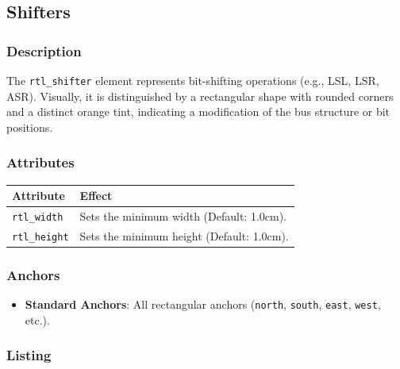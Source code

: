 \subsection{\sffamily Shifters}

    \subsubsection{\sffamily Description}
        The \texttt{rtl\_shifter} element represents bit-shifting operations (e.g., LSL, LSR, ASR). Visually, it is distinguished by a rectangular shape with rounded corners and a distinct orange tint, indicating a modification of the bus structure or bit positions.

    \subsubsection{\sffamily Attributes}
    \begin{center}
        \begin{tabular}{lp{8cm}}
        \toprule
            \textbf{Attribute} & \textbf{Effect} \\
            \midrule
            \texttt{rtl\_width} & Sets the minimum width (Default: 1.0cm). \\
            \texttt{rtl\_height} & Sets the minimum height (Default: 1.0cm). \\
            \bottomrule
        \end{tabular}
    \end{center}

    \subsubsection{\sffamily Anchors}
        \begin{itemize}
            \item \textbf{Standard Anchors}: All rectangular anchors (\texttt{north}, \texttt{south}, \texttt{east}, \texttt{west}, etc.).
        \end{itemize}

    \subsubsection{\sffamily Listing}
\begin{RTLexample}
\end{RTLexample}

